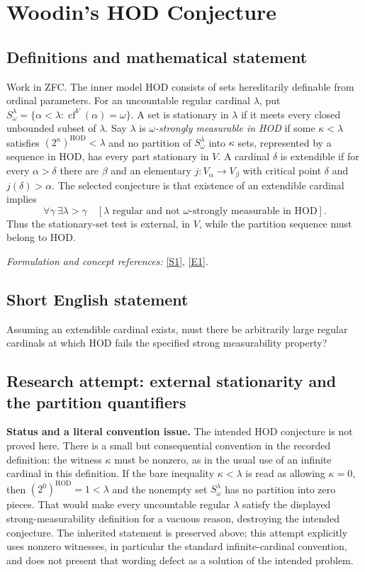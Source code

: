 \documentclass[11pt]{article}
\begin{document}
\section*{\texorpdfstring{Woodin's HOD Conjecture}{Woodin's HOD Conjecture}}\label{30006846}
\subsection{Definitions and mathematical statement}
Work in ZFC. The inner model $\mathrm{HOD}$ consists of sets hereditarily definable from ordinal parameters. For an uncountable regular cardinal $\lambda$, put $S^\lambda_\omega=\{\alpha<\lambda:\operatorname{cf}^V(\alpha)=\omega\}$. A set is stationary in $\lambda$ if it meets every closed unbounded subset of $\lambda$. Say $\lambda$ is \emph{$\omega$-strongly measurable in HOD} if some $\kappa<\lambda$ satisfies $(2^\kappa)^{\mathrm{HOD}}<\lambda$ and no partition of $S^\lambda_\omega$ into $\kappa$ sets, represented by a sequence in HOD, has every part stationary in $V$. A cardinal $\delta$ is extendible if for every $\alpha>\delta$ there are $\beta$ and an elementary $j:V_\alpha\to V_\beta$ with critical point $\delta$ and $j(\delta)>\alpha$. The selected conjecture is that existence of an extendible cardinal implies
\[
 \forall\gamma\ \exists\lambda>\gamma\quad
 [\lambda\text{ regular and not $\omega$-strongly measurable in HOD}].
\]
Thus the stationary-set test is external, in $V$, while the partition sequence must belong to HOD.
\par\smallskip\textit{Formulation and concept references:} \href{http://panhellenic-logic-symposium.org/12/slides/Day2_Bagaria.pdf}{[S1]}, \href{https://arxiv.org/html/1605.00613v1}{[E1]}.

\subsection{Short English statement}
Assuming an extendible cardinal exists, must there be arbitrarily large regular cardinals at which HOD fails the specified strong measurability property?
\subsection{Research attempt: external stationarity and the partition quantifiers}
\textbf{Status and a literal convention issue.} The intended HOD conjecture is not proved here. There is a small but consequential convention in the recorded definition: the witness $\kappa$ must be nonzero, as in the usual use of an infinite cardinal in this definition. If the bare inequality $\kappa<\lambda$ is read as allowing $\kappa=0$, then $(2^0)^{\mathrm{HOD}}=1<\lambda$ and the nonempty set $S^\lambda_\omega$ has no partition into zero pieces. That would make every uncountable regular $\lambda$ satisfy the displayed strong-measurability definition for a vacuous reason, destroying the intended conjecture. The inherited statement is preserved above; this attempt explicitly uses nonzero witnesses, in particular the standard infinite-cardinal convention, and does not present that wording defect as a solution of the intended problem.
\end{document}
